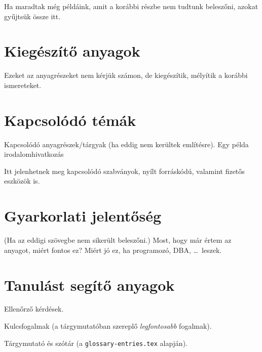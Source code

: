 Ha maradtak még példáink, amit a korábbi részbe nem tudtunk beleszőni, azokat gyűjtsük össze itt.

\section{Kiegészítő anyagok}

Ezeket az anyagrészeket nem kérjük számon, de kiegészítik, mélyítik a korábbi ismereteket.

\section{Kapcsolódó témák}

Kapcsolódó anyagrészek/tárgyak (ha eddig nem kerültek említésre). Egy példa irodalomhivatkozás~\cite{DBLP:books/cs/Ullman88}

Itt jelenhetnek meg kapcsolódó szabványok, nyílt forráskódú, valamint fizetős eszközök is.

\section{Gyarkorlati jelentőség}

(Ha az eddigi szövegbe nem sikerült beleszőni.) Most, hogy már értem az anyagot, miért fontos ez? Miért jó ez, ha programozó, DBA, \ldots\ leszek.

\section{Tanulást segítő anyagok}

Ellenőrző kérdések.

Kulcsfogalmak (a tárgymutatóban szereplő \emph{legfontosabb} fogalmak).

Tárgymutató és szótár (a \texttt{glossary-entries.tex} alapján).